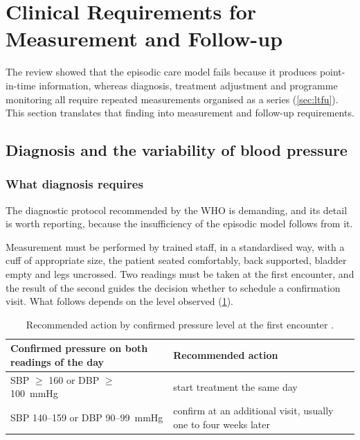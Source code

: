 \documentclass[12pt,a4paper,oneside]{report}
\begin{document}
\section{Clinical Requirements for Measurement and Follow-up}\label{sec:clinical-req}\label{sec:protocol-gap}

The review showed that the episodic care model fails because it produces point-in-time information, whereas diagnosis, treatment adjustment and programme monitoring all require repeated measurements organised as a series (\cref{sec:ltfu}). This section translates that finding into measurement and follow-up requirements.

\subsection{Diagnosis and the variability of blood pressure}

\subsubsection{What diagnosis requires}\label{sec:dx-requires}

The diagnostic protocol recommended by the WHO is demanding, and its detail is worth reporting, because the insufficiency of the episodic model follows from it.

Measurement must be performed by trained staff, in a standardised way, with a cuff of appropriate size, the patient seated comfortably, back supported, bladder empty and legs uncrossed. Two readings must be taken at the first encounter, and the result of the second guides the decision whether to schedule a confirmation visit. What follows depends on the level observed (\cref{tab:protocol}).

\begin{table}[htbp]
\centering\small
\caption{Recommended action by confirmed pressure level at the first encounter \parencite{who2023hypertension}.}\label{tab:protocol}
\begin{tabularx}{\textwidth}{@{}>{\raggedright\arraybackslash}p{6.2cm} X@{}}
\toprule
\textbf{Confirmed pressure on both readings of the day} & \textbf{Recommended action} \\
\midrule
SBP $\geq$ 160 or DBP $\geq$ 100~mmHg & start treatment the same day \\
SBP 140--159 or DBP 90--99~mmHg & confirm at an additional visit, usually one to four weeks later \\
\bottomrule
\end{tabularx}
\end{table}
\end{document}
